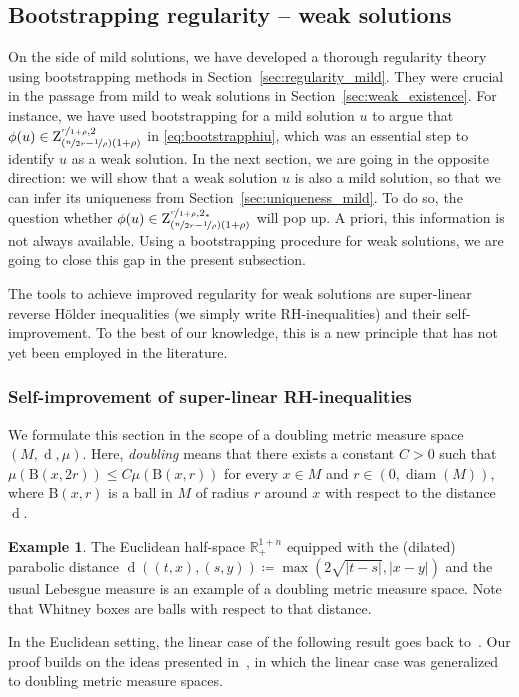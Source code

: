 \documentclass[11pt, leqno]{amsart}
\theoremstyle{definition}
\newtheorem{example}[theorem]{Example}
\newcommand{\R}{\mathbb{R}}
\newcommand{\Z}{\mathrm{Z}}
\newcommand{\B}{\mathrm{B}}
\DeclareMathOperator{\dist}{d}
\DeclareMathOperator{\diam}{diam}
\begin{document}
	\subsection{Bootstrapping regularity -- weak solutions}
	\label{sec:regularity_weak}

	On the side of mild solutions, we have developed a thorough regularity theory using bootstrapping methods in Section~\ref{sec:regularity_mild}. They were crucial in the passage from mild to weak solutions in Section~\ref{sec:weak_existence}. For instance, we have used bootstrapping for a mild solution $u$ to argue that $\phi(u) \in\Z^{\nicefrac{r}{1+\rho},2}_{(\nicefrac{n}{2r} - \nicefrac{1}{\rho})(1+\rho)}$ in \eqref{eq:bootstrapphiu}, which was an essential step to identify $u$ as a weak solution. In the next section, we are going in the opposite direction: we will show that a weak solution $u$ is also a mild solution, so that we can infer its uniqueness from Section~\ref{sec:uniqueness_mild}. To do so, the question whether $\phi(u) \in \Z^{\nicefrac{r}{1+\rho},2_*}_{(\nicefrac{n}{2r} - \nicefrac{1}{\rho})(1+\rho)}$ will pop up. A priori, this information is not always available. Using a bootstrapping procedure for weak solutions, we are going to close this gap in the present subsection.

	The tools to achieve improved regularity for weak solutions are super-linear reverse Hölder inequalities (we simply write RH-inequalities) and their self-improvement. To the best of our knowledge, this is a new principle that has not yet been employed in the literature.

	\subsubsection{Self-improvement of super-linear RH-inequalities}
	\label{subsec:rh_self_improvement}

	We formulate this section in the scope of a doubling metric measure space $(M, \dist, \mu)$. Here, \emph{doubling} means that there exists a constant $C>0$ such that $\mu(\B(x,2r)) \leq C \mu(\B(x,r))$ for every $x\in M$ and $r \in (0, \diam(M))$, where $\B(x,r)$ is a ball in $M$ of radius $r$ around $x$ with respect to the distance~$\dist$.
	\begin{example}
		\label{ex:parabolic_distance}
		The Euclidean half-space $\R^{1+n}_+$ equipped with the (dilated) parabolic distance $\dist((t,x),(s,y)) \coloneqq \max(2\sqrt{|t-s|}, |x-y|)$ and the usual Lebesgue measure is an example of a doubling metric measure space. Note that Whitney boxes are balls with respect to that distance.
	\end{example}
	In the Euclidean setting, the linear case of the following result goes back to~\cite{RH}. Our proof builds on the ideas presented in~\cite{BCF}, in which the linear case was generalized to doubling metric measure spaces.
\end{document}
